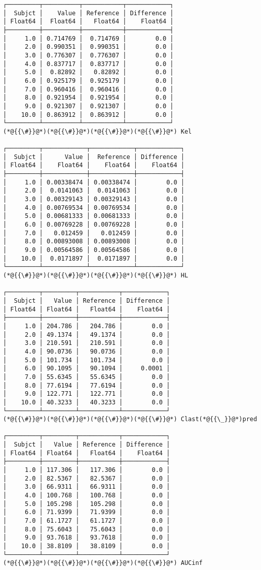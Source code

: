 \documentclass[12pt,a4paper]{article}
\begin{document}
\begin{lstlisting}
┌─────────┬──────────┬───────────┬────────────┐
│  Subjct │    Value │ Reference │ Difference │
│ Float64 │  Float64 │   Float64 │    Float64 │
├─────────┼──────────┼───────────┼────────────┤
│     1.0 │ 0.714769 │  0.714769 │        0.0 │
│     2.0 │ 0.990351 │  0.990351 │        0.0 │
│     3.0 │ 0.776307 │  0.776307 │        0.0 │
│     4.0 │ 0.837717 │  0.837717 │        0.0 │
│     5.0 │  0.82892 │   0.82892 │        0.0 │
│     6.0 │ 0.925179 │  0.925179 │        0.0 │
│     7.0 │ 0.960416 │  0.960416 │        0.0 │
│     8.0 │ 0.921954 │  0.921954 │        0.0 │
│     9.0 │ 0.921307 │  0.921307 │        0.0 │
│    10.0 │ 0.863912 │  0.863912 │        0.0 │
└─────────┴──────────┴───────────┴────────────┘
(*@{{\#}}@*)(*@{{\#}}@*)(*@{{\#}}@*)(*@{{\#}}@*) Kel

┌─────────┬────────────┬────────────┬────────────┐
│  Subjct │      Value │  Reference │ Difference │
│ Float64 │    Float64 │    Float64 │    Float64 │
├─────────┼────────────┼────────────┼────────────┤
│     1.0 │ 0.00338474 │ 0.00338474 │        0.0 │
│     2.0 │  0.0141063 │  0.0141063 │        0.0 │
│     3.0 │ 0.00329143 │ 0.00329143 │        0.0 │
│     4.0 │ 0.00769534 │ 0.00769534 │        0.0 │
│     5.0 │ 0.00681333 │ 0.00681333 │        0.0 │
│     6.0 │ 0.00769228 │ 0.00769228 │        0.0 │
│     7.0 │   0.012459 │   0.012459 │        0.0 │
│     8.0 │ 0.00893008 │ 0.00893008 │        0.0 │
│     9.0 │ 0.00564586 │ 0.00564586 │        0.0 │
│    10.0 │  0.0171897 │  0.0171897 │        0.0 │
└─────────┴────────────┴────────────┴────────────┘
(*@{{\#}}@*)(*@{{\#}}@*)(*@{{\#}}@*)(*@{{\#}}@*) HL

┌─────────┬─────────┬───────────┬────────────┐
│  Subjct │   Value │ Reference │ Difference │
│ Float64 │ Float64 │   Float64 │    Float64 │
├─────────┼─────────┼───────────┼────────────┤
│     1.0 │ 204.786 │   204.786 │        0.0 │
│     2.0 │ 49.1374 │   49.1374 │        0.0 │
│     3.0 │ 210.591 │   210.591 │        0.0 │
│     4.0 │ 90.0736 │   90.0736 │        0.0 │
│     5.0 │ 101.734 │   101.734 │        0.0 │
│     6.0 │ 90.1095 │   90.1094 │     0.0001 │
│     7.0 │ 55.6345 │   55.6345 │        0.0 │
│     8.0 │ 77.6194 │   77.6194 │        0.0 │
│     9.0 │ 122.771 │   122.771 │        0.0 │
│    10.0 │ 40.3233 │   40.3233 │        0.0 │
└─────────┴─────────┴───────────┴────────────┘
(*@{{\#}}@*)(*@{{\#}}@*)(*@{{\#}}@*)(*@{{\#}}@*) Clast(*@{{\_}}@*)pred

┌─────────┬─────────┬───────────┬────────────┐
│  Subjct │   Value │ Reference │ Difference │
│ Float64 │ Float64 │   Float64 │    Float64 │
├─────────┼─────────┼───────────┼────────────┤
│     1.0 │ 117.306 │   117.306 │        0.0 │
│     2.0 │ 82.5367 │   82.5367 │        0.0 │
│     3.0 │ 66.9311 │   66.9311 │        0.0 │
│     4.0 │ 100.768 │   100.768 │        0.0 │
│     5.0 │ 105.298 │   105.298 │        0.0 │
│     6.0 │ 71.9399 │   71.9399 │        0.0 │
│     7.0 │ 61.1727 │   61.1727 │        0.0 │
│     8.0 │ 75.6043 │   75.6043 │        0.0 │
│     9.0 │ 93.7618 │   93.7618 │        0.0 │
│    10.0 │ 38.8109 │   38.8109 │        0.0 │
└─────────┴─────────┴───────────┴────────────┘
(*@{{\#}}@*)(*@{{\#}}@*)(*@{{\#}}@*)(*@{{\#}}@*) AUCinf


\end{lstlisting}
\end{document}

